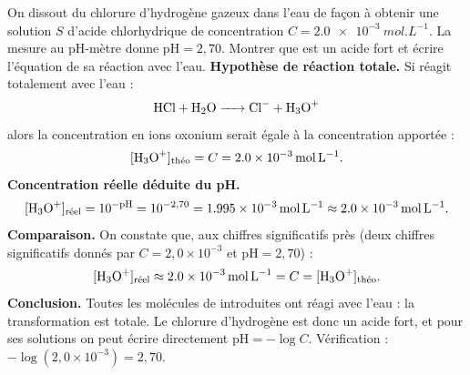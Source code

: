 \documentclass[11pt]{article}
\newcommand{\cle}[1]{{\popxbold\color{popdark}#1}}
\begin{document}
\begin{exoresolu}
On dissout du chlorure d'hydrogène gazeux  dans l'eau de façon à obtenir une solution $S$ d'acide chlorhydrique de concentration $C = \SI{2,0e-3}{mol.L^{-1}}$. La mesure au pH-mètre donne $\text{pH} = 2,70$. Montrer que  est un acide fort et écrire l'équation de sa réaction avec l'eau.
\tcblower
\textbf{Hypothèse de réaction totale.} Si  réagit totalement avec l'eau :
\[ \ce{HCl + H2O -> Cl- + H3O+} \]
alors la concentration en ions oxonium serait égale à la concentration apportée :
\[ [\ce{H3O+}]_{\text{théo}} = C = \SI{2,0e-3}{mol.L^{-1}}. \]
\textbf{Concentration réelle déduite du pH.}
\[ [\ce{H3O+}]_{\text{réel}} = 10^{-\text{pH}} = 10^{-2,70} = \SI{1,995e-3}{mol.L^{-1}} \approx \SI{2,0e-3}{mol.L^{-1}}. \]
\textbf{Comparaison.} On constate que, aux chiffres significatifs près (deux chiffres significatifs donnés par $C = 2,0\times10^{-3}$ et $\text{pH}=2,70$) :
\[ [\ce{H3O+}]_{\text{réel}} \approx \SI{2,0e-3}{mol.L^{-1}} = C = [\ce{H3O+}]_{\text{théo}}. \]
\textbf{Conclusion.} Toutes les molécules de  introduites ont réagi avec l'eau : la transformation est \cle{totale}. Le chlorure d'hydrogène est donc un \cle{acide fort}, et pour ses solutions on peut écrire directement $\text{pH} = -\log C$. Vérification : $-\log(2,0\times10^{-3}) = 2,70$.
\end{exoresolu}
\end{document}
